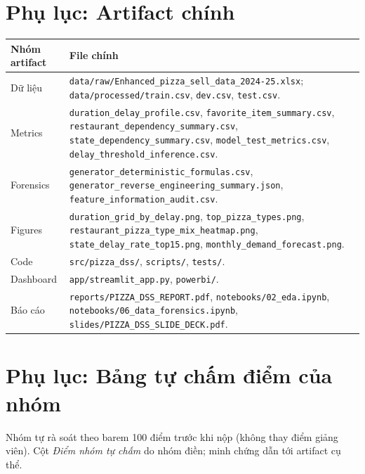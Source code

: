 \documentclass[12pt,a4paper,oneside]{report}
\newcommand{\code}[1]{\nolinkurl{#1}}
\begin{document}
\appendix
\chapter{Phụ lục: Artifact chính}

\begin{longtable}{p{4.2cm}p{9.8cm}}
\toprule
Nhóm artifact & File chính\\
\midrule
Dữ liệu & \code{data/raw/Enhanced\_pizza\_sell\_data\_2024-25.xlsx};
\code{data/processed/train.csv}, \code{dev.csv}, \code{test.csv}.\\
Metrics & \code{duration\_delay\_profile.csv}, \code{favorite\_item\_summary.csv},
\code{restaurant\_dependency\_summary.csv}, \code{state\_dependency\_summary.csv},
\code{model\_test\_metrics.csv}, \code{delay\_threshold\_inference.csv}.\\
Forensics & \code{generator\_deterministic\_formulas.csv},
\code{generator\_reverse\_engineering\_summary.json},
\code{feature\_information\_audit.csv}.\\
Figures & \code{duration\_grid\_by\_delay.png}, \code{top\_pizza\_types.png},
\code{restaurant\_pizza\_type\_mix\_heatmap.png},
\code{state\_delay\_rate\_top15.png}, \code{monthly\_demand\_forecast.png}.\\
Code & \code{src/pizza\_dss/}, \code{scripts/}, \code{tests/}.\\
Dashboard & \code{app/streamlit\_app.py}, \code{powerbi/}.\\
Báo cáo & \code{reports/PIZZA\_DSS\_REPORT.pdf},
\code{notebooks/02\_eda.ipynb}, \code{notebooks/06\_data\_forensics.ipynb},
\code{slides/PIZZA\_DSS\_SLIDE\_DECK.pdf}.\\
\bottomrule
\end{longtable}

\chapter{Phụ lục: Bảng tự chấm điểm của nhóm}

Nhóm tự rà soát theo barem 100 điểm trước khi nộp (không thay điểm giảng viên).
Cột \emph{Điểm nhóm tự chấm} do nhóm điền; minh chứng dẫn tới artifact cụ thể.
\end{document}
